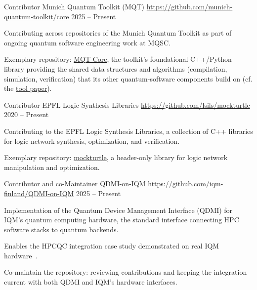 \begin{cventries}
  \cventry
    {Contributor} %
    {Munich Quantum Toolkit (MQT)} %
    {\href{https://github.com/munich-quantum-toolkit/core}{https://github.com/munich-quantum-toolkit/core}} %
    {2025 -- Present} %
    {
      \begin{cvitems} %
        \item {Contributing across repositories of the Munich Quantum Toolkit as part of ongoing quantum software engineering work at MQSC.}
        \item {Exemplary repository: \href{https://github.com/munich-quantum-toolkit/core}{MQT Core}, the toolkit's foundational C++/Python library providing the shared data structures and algorithms (compilation, simulation, verification) that its other quantum-software components build on (cf. the \href{https://arxiv.org/abs/2405.17543}{tool paper}).}
      \end{cvitems}
    }

  \cventry
    {Contributor} %
    {EPFL Logic Synthesis Libraries} %
    {\href{https://github.com/lsils/mockturtle}{https://github.com/lsils/mockturtle}} %
    {2020 -- Present} %
    {
      \begin{cvitems} %
        \item {Contributing to the EPFL Logic Synthesis Libraries, a collection of C++ libraries for logic network synthesis, optimization, and verification.}
        \item {Exemplary repository: \href{https://github.com/lsils/mockturtle}{mockturtle}, a header-only library for logic network manipulation and optimization.}
      \end{cvitems}
    }

  \cventry
    {Contributor and co-Maintainer} %
    {QDMI-on-IQM} %
    {\href{https://github.com/iqm-finland/QDMI-on-IQM}{https://github.com/iqm-finland/QDMI-on-IQM}} %
    {2025 -- Present} %
    {
      \begin{cvitems} %
        \item {Implementation of the Quantum Device Management Interface (QDMI) for IQM's quantum computing hardware, the standard interface connecting HPC software stacks to quantum backends.}
        \item {Enables the HPCQC integration case study demonstrated on real IQM hardware~\cite{sc_2026_1}.}
        \item {Co-maintain the repository: reviewing contributions and keeping the integration current with both QDMI and IQM's hardware interfaces.}
      \end{cvitems}
    }

\end{cventries}
